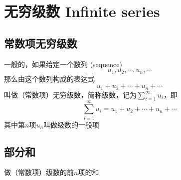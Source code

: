\documentclass[UTF8]{ctexart}
\begin{document}
\section*{无穷级数 Infinite series}
\subsection*{常数项无穷级数}
一般的，如果给定一个数列 (sequence)
\[u_1,u_2,\cdots,u_n,\cdots\]
那么由这个数列构成的表达式
\[u_1+u_2+\cdots+u_n+\cdots\]
叫做（常数项）无穷级数，简称级数，记为$\sum_{i=1}^\infty u_i$，即
\[\sum_{i=1}^\infty u_i=u_1+u_2+\cdots+u_n+\cdots\]
其中第$n$项$u_n$叫做级数的一般项

\subsection*{部分和}

做（常数项）级数的前$n$项的和
\end{document}
